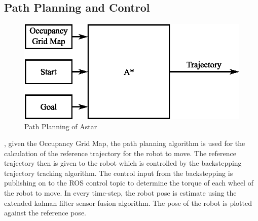 \subsection{Path Planning and Control}
\begin{figure}[ht]
	\centering
	\includegraphics[scale=1]{images/imagess/3method-astar.eps} 
	\caption{Path Planning of Astar}
	\label{fig:Path Planning of Astar}
\end{figure}
\hspace{1.27cm}
\textbf{\figureautorefname{ \ref{fig:Path Planning of Astar}}}, given the Occupancy Grid Map, the path planning algorithm is used for the calculation of  the reference trajectory for the robot to move. The reference trajectory then is given to the robot which is controlled by the backstepping trajectory tracking algorithm. The control input from the backstepping is publishing on to the ROS control topic to determine the torque of each wheel of the robot to move. In every time-step, the robot pose is estimate using the extended kalman filter sensor fusion algorithm. The pose of the robot is plotted against the reference pose.\par


